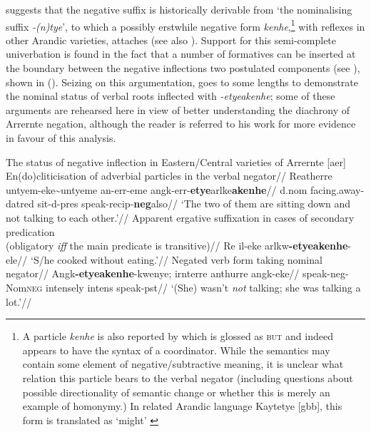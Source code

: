 \documentclass[usenames,dvipsnames,11pt]{article}
\begin{document}
{\citet[235, fn 17]{Wilkins1989} suggests that the negative suffix is historically derivable from `the nominalising suffix \textit{-(n)tye}', to which a possibly erstwhile negative form \textit{kenhe},\footnote{A particle \textit{kenhe} is also reported by \citet[372]{Wilkins1989} which is glossed as \textsc{but} and indeed appears to have the syntax of a coordinator. While the semantics may contain some element of negative/subtractive meaning, it is unclear what relation this particle bears to the verbal negator (including questions about possible directionality of semantic change or whether this is merely an example of homonymy.) In related Arandic language Kaytetye [\gls{gbb}], this form is translated as `might' \citep[424]{KaytetyeDict}} with reflexes in other Arandic varieties, attaches (see also \citealt[275]{Yallop1977}). Support for this semi-complete univerbation is found in the fact that a number of formatives can be inserted at the boundary between the negative inflections two postulated components (see \citealt[378\textit{ff}]{Wilkins1989}), shown in (). Seizing on this argumentation, \citet[411-26]{Henderson2013} goes to some lengths to demonstrate the nominal status of verbal roots inflected with \textit{-etye\textdblhyphen akenhe}; some of these arguments are rehearsed here in view of better understanding the diachrony of Arrernte negation, although the reader is referred to his work for more evidence in favour of this analysis.

\pex The status of negative inflection in Eastern/Central varieties of Arrernte [\gls{aer}]
	\a\begingl\glpreamble En(do)cliticisation of adverbial particles in the verbal negator//
	\gla Re\textdblhyphen atherre untyem-eke\textasciitilde untyeme an-err-eme angk-err-\textbf{etye}\guillemotleft arlke\guillemotright \textbf{akenhe}//
		\gls{d}.\gls{nom} facing.away-\gls{dat}\textdblhyphen\gls{red} sit-\gls{d}-\gls{pres} speak-\gls{recip}-\textbf{\gls{neg}}\guillemotleft also\guillemotright//
		\glft`The two of them are sitting down and not talking to each other.'//
		\endgl
	\a\begingl\glpreamble Apparent ergative suffixation in cases of secondary predication\\(obligatory \textsl{iff} the main predicate is transitive)//
		\gla Re il-eke arlkw\textbf{-etye\textdblhyphen akenhe}-ele//
		\glft`S/he cooked without eating.'//\endgl
		\a\begingl\glpreamble Negated verb form taking nominal negator//
		\gla Angk\textbf{-etye\textdblhyphen akenhe}-kwenye; irnterre anthurre angk-eke//
		\glb speak-\gls{neg}-Nom\textsc{neg} intensely \gls{intens} speak-\gls{pst}//
		\glft`(She) wasn't \textit{not} talking; she was talking a lot.'//\endgl
\xe

}
\end{document}
